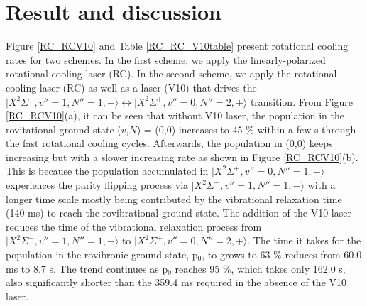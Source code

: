 \documentclass[nofootinbib,aip,jcp,reprint]{revtex4-1}
\begin{document}
\section{Result and discussion}
Figure \ref{RC_RCV10} and Table \ref{RC_RC_V10table} present rotational cooling rates for two schemes. In the first scheme, we apply the linearly-polarized rotational cooling laser (RC). In the second scheme, we apply the rotational cooling laser (RC) as well as a laser (V10) that drives the $\lvert X^2\Sigma^+, v''=1, N''=1, -\rangle \leftrightarrow \lvert X^2\Sigma^+, v''=0, N''=2, +\rangle$ transition. From Figure \ref{RC_RCV10}(a), it can be seen that without V10 laser, the population in the rovitational ground state ($v$,$N$) = (0,0) increases to 45 $\%$ within a few {\micro}s through the fast rotational cooling cycles. Afterwards, the population in (0,0) keeps increasing but with a slower increasing rate as shown in Figure \ref{RC_RCV10}(b). This is because the population accumulated in $\lvert X^2\Sigma^+, v''=0, N''=1, -\rangle$ experiences the parity flipping process via $\lvert X^2\Sigma^+, v''=1, N''=1, -\rangle$ with a longer time scale mostly being contributed by the vibrational relaxation time (140 ms) to reach the rovibrational ground state. The addition of the V10 laser reduces the time of the vibrational relaxation process from $\lvert X^2\Sigma^+, v''=1, N''=1, -\rangle$ to $\lvert X^2\Sigma^+, v''=0, N''=2, +\rangle$. The time it takes for the population in the rovibronic ground state, p$_0$, to grows to 63 $\%$ reduces from 60.0 ms to 8.7 {\micro}s. The trend continues as p$_0$ reaches 95 $\%$, which takes only 162.0 {\micro}s, also significantly shorter than the 359.4 ms required in the absence of the V10 laser.
\end{document}
